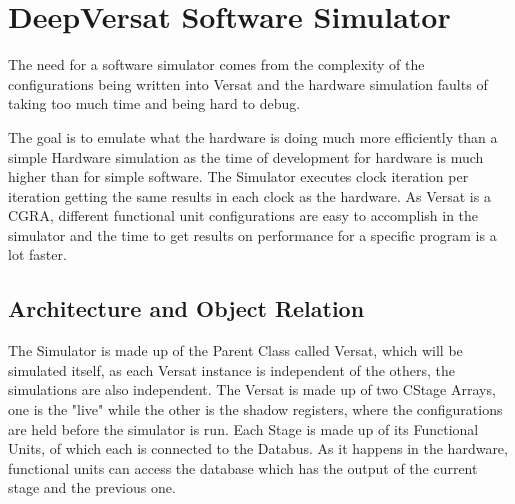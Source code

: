 \documentclass[conference]{IEEEtran}
\begin{document}
% 




\section{DeepVersat Software Simulator}
\label{chapter:Simulator}

The need for a software simulator comes from the complexity of the configurations 
being written into Versat and the hardware simulation faults of taking too much time and being hard to debug.

The goal is to emulate what the hardware is doing much more efficiently than 
a simple Hardware simulation as the time of development for hardware
is much higher than for simple software. The Simulator executes clock iteration per iteration 
getting the same results in each clock as the hardware. 
As Versat is a CGRA, different functional unit configurations are easy to accomplish 
in the simulator and the time to get results on performance
for a specific program is a lot faster. 





\subsection{Architecture and Object Relation}

The Simulator is made up of the Parent Class called Versat, which will be simulated itself, 
as each Versat instance is independent of the others, the simulations are also independent.
The Versat is made up of two CStage Arrays, one is the "live" while the other is the 
shadow registers, where the configurations are held before the simulator is run.
Each Stage is made up of its Functional Units, of which each is connected to the Databus.
As it happens in the hardware, functional units can access the database which has the output 
of the current stage and the previous one.
\end{document}
